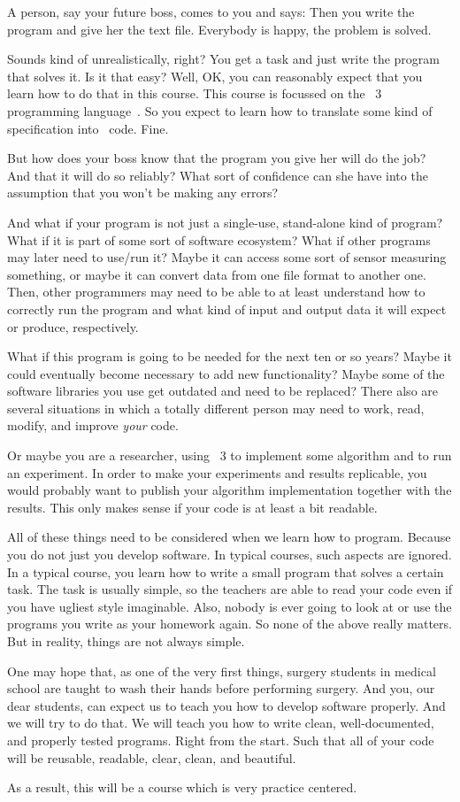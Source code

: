 A person, say your future boss, comes to you and says:
Then you write the program and give her the text file.
Everybody is happy, the problem is solved.

Sounds kind of unrealistically, right?
You get a task and just write the program that solves it.
Is it that easy?
Well, OK, you can reasonably expect that you learn how to do that in this course.
This course is focussed on the \python~3 programming language~\cite{H2023ABGTP3P,LH2015DSAAWP}.
So you expect to learn how to translate some kind of specification into \python\ code.
Fine.

But how does your boss know that the program you give her will do the job?
And that it will do so reliably?
What sort of confidence can she have into the assumption that you won't be making any errors?

And what if your program is not just a single-use, stand-alone kind of program?
What if it is part of some sort of software ecosystem?
What if other programs may later need to use/run it?
Maybe it can access some sort of sensor measuring something, or maybe it can convert data from one file format to another one.
Then, other programmers may need to be able to at least understand how to correctly run the program and what kind of input and output data it will expect or produce, respectively.

What if this program is going to be needed for the next ten or so years?
Maybe it could eventually become necessary to add new functionality?
Maybe some of the software libraries you use get outdated and need to be replaced?
There also are several situations in which a totally different person may need to work, read, modify, and improve \emph{your} code.

Or maybe you are a researcher, using \python~3 to implement some algorithm and to run an experiment.
In order to make your experiments and results replicable, you would probably want to publish your algorithm implementation together with the results.
This only makes sense if your code is at least a bit readable.

All of these things need to be considered when we learn how to program.
Because you do not just  you develop software.
In typical courses, such aspects are ignored.
In a typical course, you learn how to write a small program that solves a certain task.
The task is usually simple, so the teachers are able to read your code even if you have ugliest style imaginable.
Also, nobody is ever going to look at or use the programs you write as your homework again.
So none of the above really matters.
But in reality, things are not always simple.

One may hope that, as one of the very first things, surgery students in medical school are taught to wash their hands before performing surgery.
And you, our dear students, can expect us to teach you how to develop software properly.
And we will try to do that.
We will teach you how to write clean, well-documented, and properly tested programs.
Right from the start.
Such that all of your code will be reusable, readable, clear, clean, and beautiful.

As a result, this will be a course which is very practice centered.%
\endhsection%
%
